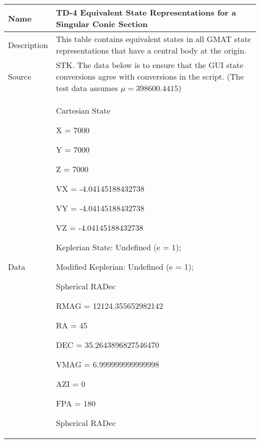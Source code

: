 \begin{table}[htbp!]
\centering
      \begin{tabular}{|p{1.0 in} |p{5.0 in} |}
         \hline
          \rowcolor[rgb]{0.8,0.8,0.8}  Name & TD-4 Equivalent State Representations for a Singular Conic Section\\
         \hline
         Description & This table contains equivalent states in all GMAT state representations
         that have a central body at the origin.    \\ \hline
         Source &  STK.  The data below is to ensure that the GUI state conversions agree with conversions in the script. (The test data assumes $\mu = 398600.4415$)\\
         \hline
         Data &
          \begin{compactenum}
              \item Cartesian State
              \begin{compactenum}
                  \item X = 7000
                  \item Y = 7000
                  \item Z = 7000
                  \item VX = -4.04145188432738
                  \item VY = -4.04145188432738
                  \item VZ = -4.04145188432738
              \end{compactenum}
              \item Keplerian State: Undefined (e = 1);
              \item Modified Keplerian: Undefined (e = 1);
              \item Spherical RADec
               \begin{compactenum}
                  \item RMAG = 12124.355652982142
                  \item RA = 45
                  \item DEC = 35.2643896827546470
                  \item VMAG = 6.999999999999998
                  \item AZI = 0
                  \item FPA = 180
              \end{compactenum}
              \item Spherical RADec
               \begin{compactenum}

\end{compactenum}
\end{compactenum}
\end{tabular}
\end{table}

